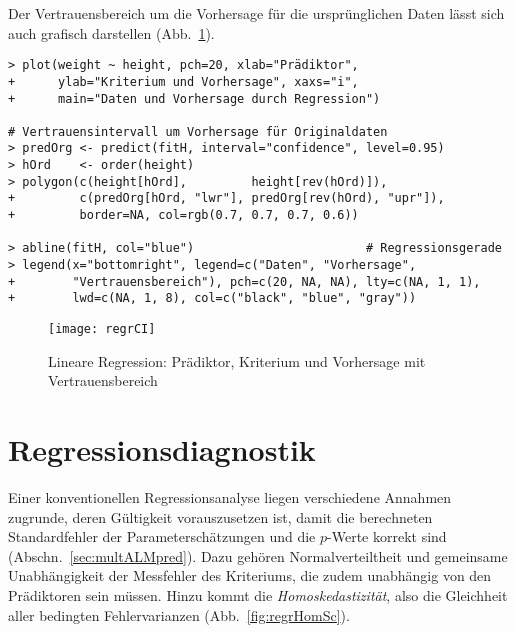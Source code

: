 Der Vertrauensbereich um die Vorhersage für die ursprünglichen Daten lässt sich auch grafisch darstellen (Abb.\ \ref{fig:regrCI}).
\begin{lstlisting}
> plot(weight ~ height, pch=20, xlab="Prädiktor",
+      ylab="Kriterium und Vorhersage", xaxs="i",
+      main="Daten und Vorhersage durch Regression")

# Vertrauensintervall um Vorhersage für Originaldaten
> predOrg <- predict(fitH, interval="confidence", level=0.95)
> hOrd    <- order(height)
> polygon(c(height[hOrd],         height[rev(hOrd)]),
+         c(predOrg[hOrd, "lwr"], predOrg[rev(hOrd), "upr"]),
+         border=NA, col=rgb(0.7, 0.7, 0.7, 0.6))

> abline(fitH, col="blue")                        # Regressionsgerade
> legend(x="bottomright", legend=c("Daten", "Vorhersage",
+        "Vertrauensbereich"), pch=c(20, NA, NA), lty=c(NA, 1, 1),
+        lwd=c(NA, 1, 8), col=c("black", "blue", "gray"))
\end{lstlisting}

\begin{figure}[ht]
\centering
\texttt{[image: regrCI]}
\vspace*{-1em}
\caption{Lineare Regression: Prädiktor, Kriterium und Vorhersage mit Vertrauensbereich}
\label{fig:regrCI}
\end{figure}

\section{Regressionsdiagnostik}
\label{sec:regrDiag}

Einer konventionellen Regressionsanalyse liegen verschiedene Annahmen zugrunde, deren Gültigkeit vorauszusetzen ist, damit die berechneten Standardfehler der Parameterschätzungen und die $p$-Werte korrekt sind (Abschn.\ \ref{sec:multALMpred}). Dazu gehören Normalverteiltheit und gemeinsame Unabhängigkeit der Messfehler des Kriteriums, die zudem unabhängig von den Prädiktoren sein müssen. Hinzu kommt die \emph{Homoskedastizität}, also die Gleichheit aller bedingten Fehlervarianzen (Abb.\ \ref{fig:regrHomSc}).

